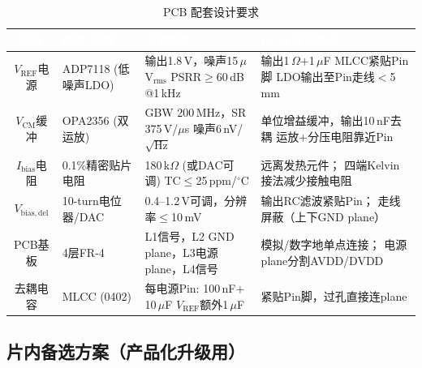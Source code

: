 \documentclass[12pt,a4paper,fontset=none]{ctexart}
\newcommand{\needtable}{\needspace{6cm}}   %
\begin{document}
\begin{table}[H]
\centering
\caption{PCB 配套设计要求}
\scriptsize
\begin{tabular}{@{}cL{2.4cm}L{4.0cm}L{5.0cm}@{}}
\toprule
{}
\textcolor{white}{\textbf{项目}} &
\textcolor{white}{\textbf{器件/方案}} &
\textcolor{white}{\textbf{关键规格}} &
\textcolor{white}{\textbf{PCB 布局要点}} \\
\midrule
$V_{\mathrm{REF}}$电源 &
ADP7118 (低噪声LDO) &
输出1.8\,V，噪声15\,$\mu$V$_{\mathrm{rms}}$\newline
PSRR$\ge$60\,dB @1\,kHz &
输出1\,$\Omega$$+$1\,$\mu$F MLCC紧贴Pin脚\newline
LDO输出至Pin走线$<$5\,mm \\
\midrule
$V_{\mathrm{CM}}$缓冲 &
OPA2356 (双运放) &
GBW 200\,MHz，SR 375\,V/$\mu$s\newline
噪声6\,nV/$\!\sqrt{\mathrm{Hz}}$ &
单位增益缓冲，输出10\,nF去耦\newline
运放$+$分压电阻靠近Pin \\
\midrule
$I_{\mathrm{bias}}$电阻 &
0.1\%精密贴片电阻 &
180\,k$\Omega$ (或DAC可调)\newline
TC$\le$25\,ppm/$^\circ$C &
远离发热元件；\newline
四端Kelvin接法减少接触电阻 \\
\midrule
$V_{\mathrm{bias,del}}$ &
10-turn电位器/DAC &
0.4--1.2\,V可调，分辨率$\le$10\,mV &
输出RC滤波紧贴Pin；\newline
走线屏蔽（上下GND plane） \\
\midrule
PCB基板 &
4层FR-4 &
L1信号，L2 GND plane，L3电源plane，L4信号 &
模拟/数字地单点连接；\newline
电源plane分割AVDD/DVDD \\
\midrule
去耦电容 &
MLCC (0402) &
每电源Pin: 100\,nF$+$10\,$\mu$F\newline
$V_{\mathrm{REF}}$额外1\,$\mu$F &
紧贴Pin脚，过孔直接连plane \\
\bottomrule
\end{tabular}
\end{table}

\needtable
\subsection{片内备选方案（产品化升级用）}
\end{document}
